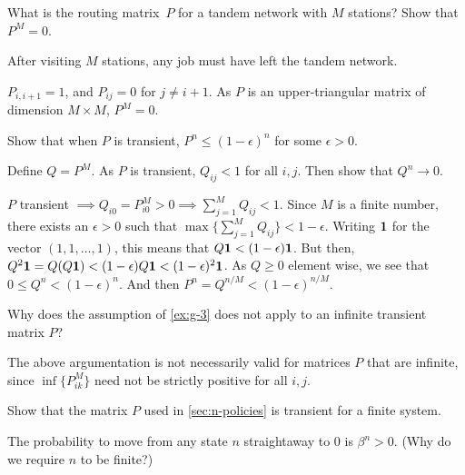 \begin{exercise}
What is the  routing matrix~$P$ for a tandem network with $M$ stations? Show that $P^M = 0$.
\begin{hint}
After visiting $M$ stations, any job must have left the tandem network.
\end{hint}
\begin{solution}
$P_{i, i+1} = 1$, and $P_{i j} = 0$ for $j\neq i+1$. As $P$ is an upper-triangular matrix of dimension $M\times M$, $P^M =0$. 
\end{solution}
\end{exercise}



\begin{exercise}\label{ex:g-3}
Show that when $P$ is transient, $P^n \leq (1-\epsilon)^n$ for some $\epsilon > 0$.
\begin{hint}
  Define $Q= P^M$. As $P$ is transient, $Q_{ij} < 1$ for all $i, j$. Then show that $Q^n \to 0$. 
\end{hint}
\begin{solution}
  $P$ transient $\implies Q_{i0} = P_{i0}^M > 0 \implies \sum_{j=1}^M Q_{ij} < 1$.
  Since $M$ is a finite number, there exists an $\epsilon>0$ such that $\max\{\sum_{j=1}^M Q_{ij}\} < 1-\epsilon$.
  Writing $\bf 1$ for the vector $(1,1,\ldots, 1)$, this  means that $Q{\bf 1} < (1-\epsilon) {\bf 1}$.
  But then, $ Q^{2} {\bf 1} = Q(Q{\bf 1}) < (1-\epsilon) Q{\bf 1} < (1-\epsilon)^2 {\bf 1}$.
As $Q\geq 0$ element wise, we see that $0\leq Q^n < (1-\epsilon)^n$. And then $P^n = Q^{n/M} < (1-\epsilon)^{n/M}$. 
\end{solution}
\end{exercise}




\begin{exercise}
  Why does the assumption of \cref{ex:g-3} does not apply to an infinite transient matrix $P$?
\begin{solution}
  The above argumentation is not necessarily valid for matrices $P$ that are infinite, since $\inf\{P^{M}_{ik}\}$ need not be strictly positive for all $i, j$. 
\end{solution}
\end{exercise}

\begin{exercise}
Show that the matrix $P$  used in \cref{sec:n-policies} is transient for a finite system.
\begin{solution}
The probability to move from any state $n$ straightaway to $0$ is $\beta^n >0$. (Why do we require $n$ to be finite?)
\end{solution}
\end{exercise}



